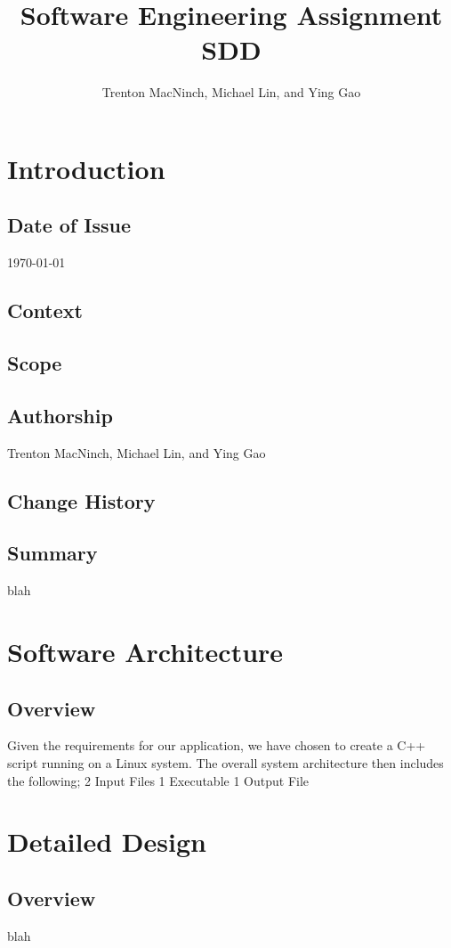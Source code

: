 \documentclass{article}
\title{\textbf{Software Engineering Assignment SDD}}
\author{Trenton MacNinch, Michael Lin, and Ying Gao}
\begin{document}
\maketitle
\newpage

\tableofcontents
\newpage

\section{Introduction}
\subsection{Date of Issue}
\today
\subsection{Context}
\subsection{Scope}
\subsection{Authorship}
Trenton MacNinch, Michael Lin, and Ying Gao
\subsection{Change History}
\subsection{Summary}
blah

\section{Software Architecture}
\subsection{Overview}
Given the requirements for our application, we have chosen to create a C++ script running on a Linux system. The overall system architecture then includes the following; 
2 Input Files
1 Executable
1 Output File

\section{Detailed Design}
\subsection{Overview}
blah
\end{document}
